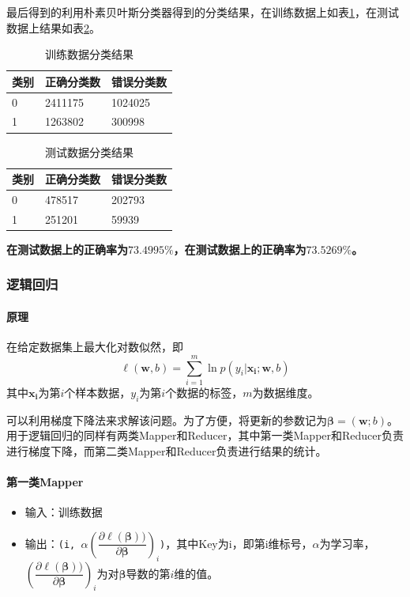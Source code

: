 \documentclass{ML}
\begin{document}
最后得到的利用朴素贝叶斯分类器得到的分类结果，在训练数据上如表\ref{tab:nb1}，在测试数据上结果如表\ref{tab:nb2}。

\begin{table}[htb]
    \centering
    \begin{tabular}{|l|l|l|}
    \hline
    类别 & 正确分类数   & 错误分类数  \\ \hline
    0  & 2411175 & 1024025 \\ \hline
    1  & 1263802 & 300998 \\ \hline
    \end{tabular}
    \caption{训练数据分类结果}\label{tab:nb1}
\end{table}

\begin{table}[htb]
    \centering
    \begin{tabular}{|l|l|l|}
    \hline
    类别 & 正确分类数  & 错误分类数  \\ \hline
    0  & 478517 & 202793 \\ \hline
    1  & 251201 & 59939  \\ \hline
    \end{tabular}
    \caption{测试数据分类结果}\label{tab:nb2}
\end{table}

\textbf{在测试数据上的正确率为$73.4995\%$，在测试数据上的正确率为$73.5269\%$。}

\subsubsection{逻辑回归}
\paragraph{原理} 在给定数据集上最大化对数似然\cite{ml-book}，即
$$
    \ell(\mathbf{w}, b) = \sum_{i = 1}^m \ln p(y_i|\mathbf{x_i;w}, b)
$$
其中$\mathbf{x_i}$为第$i$个样本数据，$y_i$为第$i$个数据的标签，$m$为数据维度。

可以利用梯度下降法来求解该问题。为了方便，将更新的参数记为$\mathbf{\beta} = (\mathbf{w};b)$。
用于逻辑回归的同样有两类Mapper和Reducer，其中第一类Mapper和Reducer负责进行梯度下降，而第二类Mapper和Reducer负责进行结果的统计。

\paragraph{第一类Mapper}
\begin{itemize}
    \item 输入：训练数据
    \item 输出：\texttt{(i, $\alpha \left(\dfrac{\partial \ell(\mathbf{\beta}))}{\partial \mathbf{\beta}}\right)_i$)}，其中Key为i，即第i维标号，$\alpha$为学习率，$\left(\dfrac{\partial \ell(\mathbf{\beta}))}{\partial \mathbf{\beta}}\right)_i$为对$\mathbf{\beta}$导数的第$i$维的值。
\end{itemize}
\end{document}
